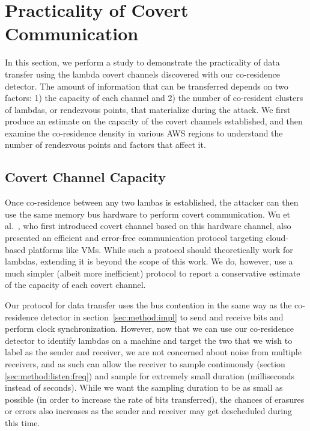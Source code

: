 \section{Practicality of Covert Communication}
\label{sec:study}

In this section, we perform a study to demonstrate the practicality of data
transfer using the lambda covert channels discovered with our co-residence
detector.  The amount of information that can be transferred depends on two
factors: 1) the capacity of each channel and 2) the number of co-resident
clusters of lambdas, or rendezvous points, that materialize during the attack.
We first produce an estimate on the capacity of the covert channels established,
and then examine the co-residence density in various AWS regions to understand
the number of rendezvous points and factors that affect it.

\subsection{Covert Channel Capacity}

Once co-residence between any two lambas is established, the attacker can then
use the same memory bus hardware to perform covert communication. Wu et
al.~\cite{wuusenix2012}, who first introduced covert channel based on this
hardware channel, also presented an efficient and error-free communication
protocol targeting cloud-based platforms like VMs.  While such a protocol should
theoretically work for lambdas, extending it is beyond the scope of this work.
We do, however, use a much simpler (albeit more inefficient) protocol to report
a conservative estimate of the capacity of each covert channel.

Our protocol for data transfer uses the bus contention in the same way as the
co-residence detector in section~\ref{sec:method:impl} to send and receive bits
and perform clock synchronization. However, now that we can use our co-residence
detector to identify lambdas on a machine and target the two that we wish to
label as the sender and receiver, we are not concerned about noise from multiple
receivers, and as such can allow the receiver to sample continuously (section
\ref{sec:method:listen:freq}) and sample for extremely small duration
(milliseconds instead of seconds). While we want the sampling duration to be as
small as possible (in order to increase the rate of bits transferred), the
chances of erasures or errors also increases as the sender and receiver may get
descheduled during this time. 

